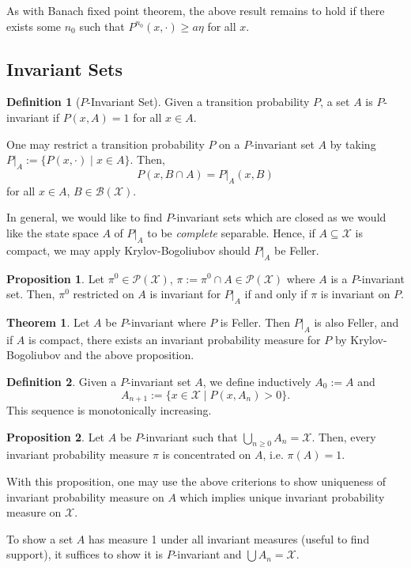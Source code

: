 \documentclass[]{article}
\theoremstyle{definition}
\newtheorem*{theorem}{Theorem}
\newtheorem*{definition}{Definition}
\newtheorem*{proposition}{Proposition}
\begin{document}
As with Banach fixed point theorem, the above result remains to hold if there 
exists some \(n_0\) such that \(P^{n_0}(x, \cdot) \ge a \eta\) for all \(x\). 

\subsection*{Invariant Sets}

\begin{definition}[\(P\)-Invariant Set]
  Given a transition probability \(P\), a set \(A\) is \(P\)-invariant if 
  \(P(x, A) = 1\) for all \(x \in A\).
\end{definition}

One may restrict a transition probability \(P\) on a \(P\)-invariant set \(A\) 
by taking \(P|_A := \{P(x, \cdot) \mid x \in A\}\). Then, 
\[P(x, B \cap A) = P|_A(x, B)\]
for all \(x \in A\), \(B \in \mathcal{B}(\mathcal{X})\).

In general, we would like to find \(P\)-invariant sets which are closed as we would 
like the state space \(A\) of \(P|_A\) to be \textit{complete} separable. Hence, 
if \(A \subseteq \mathcal{X}\) is compact, we may apply Krylov-Bogoliubov should 
\(P|_A\) be Feller.

\begin{proposition}
  Let \(\pi^0 \in \mathcal{P}(\mathcal{X})\), \(\pi := \pi^0 \cap A \in \mathcal{P}(\mathcal{X})\) 
  where \(A\) is a \(P\)-invariant set. Then, \(\pi^0\) restricted on \(A\) is invariant for 
  \(P|_A\) if and only if \(\pi\) is invariant on \(P\).
\end{proposition}

\begin{theorem}
  Let \(A\) be \(P\)-invariant where \(P\) is Feller. Then \(P|_A\) is also Feller, and 
  if \(A\) is compact, there exists an invariant probability measure for \(P\) 
  by Krylov-Bogoliubov and the above proposition.
\end{theorem}

\begin{definition}
  Given a \(P\)-invariant set \(A\), we define inductively \(A_0 := A\) and 
  \[A_{n + 1} := \{x \in \mathcal{X} \mid P(x, A_n) > 0\}.\]
  This sequence is monotonically increasing. 
\end{definition}

\begin{proposition}
  Let \(A\) be \(P\)-invariant such that \(\bigcup_{n \ge 0} A_n = \mathcal{X}\).
  Then, every invariant probability measure \(\pi\) is concentrated on \(A\), 
  i.e. \(\pi(A) = 1\).
\end{proposition}

With this proposition, one may use the above criterions to show uniqueness of 
invariant probability measure on \(A\) which implies unique invariant probability 
measure on \(\mathcal{X}\).

To show a set \(A\) has measure 1 under all invariant measures (useful to find support), 
it suffices to show it is \(P\)-invariant and \(\bigcup A_n = \mathcal{X}\).
\end{document}
